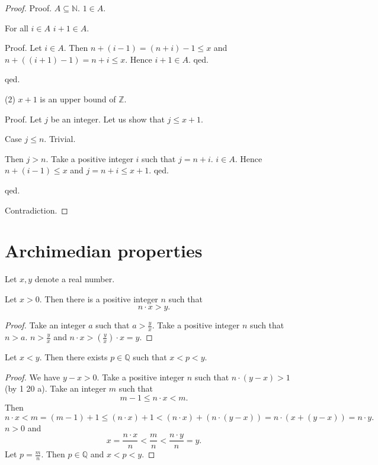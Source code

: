\documentclass{article}
\begin{document}
\begin{forthel}
\begin{proof}
Proof.
$A \subseteq \mathbb{N}$.
$1 \in A$.

For all $i \in A$ $i + 1 \in A$.

  Proof. Let $i \in A$. Then
  $n + (i -1) = (n + i) - 1 \leq x$ and
  $n + ((i + 1) - 1) = n + i \leq x$.
  Hence $i + 1 \in A$.
  qed.

qed.

(2) $x + 1$ is an upper bound of $\mathbb{Z}$.

Proof.
Let $j$ be an integer. Let us show that $j \leq x + 1$.

Case $j \leq n$. Trivial.

Then $j > n$. Take a positive integer $i$
such that $j = n + i$. $i \in A$.
Hence $n + (i-1) \leq x$ and $j = n+i \leq x + 1$.
qed.

qed.

Contradiction.
\end{proof}

\end{forthel}


\section{Archimedian properties}

\begin{forthel}
Let $x,y$ denote a real number.

\begin{theorem}[title=1 20 a]
Let $x > 0$.
Then there is a
positive integer $n$ such that \[ n \cdot x > y. \]
\end{theorem}
\begin{proof}
Take an integer $a$ such that $a > \frac{y}{x}$.
Take a positive integer $n$ such that $n > a$.
$n > \frac{y}{x}$ and $n \cdot x > (\frac{y}{x}) \cdot x = y$.
\end{proof}

\begin{theorem}[title=1 20 b]
Let $x < y$. Then there exists
$p \in \mathbb{Q}$ such that $x < p < y$.
\end{theorem}
\begin{proof}
We have $y - x > 0$.
Take a positive integer $n$ such that
$n\cdot (y-x) > 1$ (by 1 20 a).
Take an integer $m$ such that
\[ m -1 \leq n \cdot x < m. \]
Then
\[ n \cdot x < m = (m - 1) + 1 \leq (n\cdot x) + 1 <
(n\cdot x) + (n\cdot (y-x)) = n \cdot (x + (y - x)) = n \cdot y. \]
$n > 0$ and
\[ x = \frac{n\cdot x}{n} < \frac{m}{n} < \frac{n\cdot y}{n} = y. \]
Let $p = \frac{m}{n}$. Then $p \in \mathbb{Q}$ and $x < p < y$.
\end{proof}

\end{forthel}

\printbibliography
\end{document}
